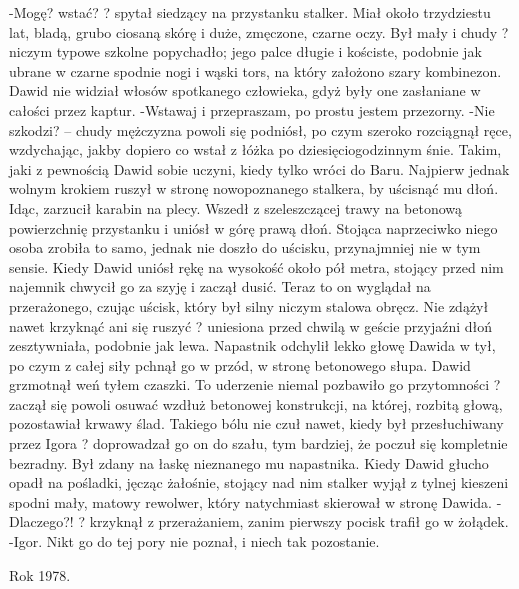 \documentclass[../MAIN.tex]{subfiles}
\begin{document}
-Mogę? wstać? ? spytał siedzący na przystanku stalker. Miał około trzydziestu lat, bladą, grubo ciosaną skórę i duże, zmęczone, czarne oczy. Był mały i chudy ? niczym typowe szkolne popychadło; jego palce długie i kościste, podobnie jak ubrane w czarne spodnie nogi i wąski tors, na który założono szary kombinezon. Dawid nie widział włosów spotkanego człowieka, gdyż były one zasłaniane w całości przez kaptur.
-Wstawaj i przepraszam, po prostu jestem przezorny.
-Nie szkodzi? -- chudy mężczyzna powoli się podniósł, po czym szeroko rozciągnął ręce, wzdychając, jakby dopiero co wstał z łóżka po dziesięciogodzinnym śnie. Takim, jaki z pewnością Dawid sobie uczyni, kiedy tylko wróci do Baru.
Najpierw jednak wolnym krokiem ruszył w stronę nowopoznanego stalkera, by uścisnąć mu dłoń. Idąc, zarzucił karabin na plecy. Wszedł z szeleszczącej trawy na betonową powierzchnię przystanku i uniósł w górę prawą dłoń. Stojąca naprzeciwko niego osoba zrobiła to samo, jednak nie doszło do uścisku, przynajmniej nie w tym sensie.
Kiedy Dawid uniósł rękę na wysokość około pół metra, stojący przed nim najemnik chwycił go za szyję i zaczął dusić.
Teraz to on wyglądał na przerażonego, czując uścisk, który był silny niczym stalowa obręcz. Nie zdążył nawet krzyknąć ani się ruszyć ? uniesiona przed chwilą w geście przyjaźni dłoń zesztywniała, podobnie jak lewa.
Napastnik odchylił lekko głowę Dawida w tył, po czym z całej siły pchnął go w przód, w stronę betonowego słupa. Dawid grzmotnął weń tyłem czaszki.
To uderzenie niemal pozbawiło go przytomności ? zaczął się powoli osuwać wzdłuż betonowej konstrukcji, na której, rozbitą głową, pozostawiał krwawy ślad. Takiego bólu nie czuł nawet, kiedy był przesłuchiwany przez Igora ? doprowadzał go on do szału, tym bardziej, że poczuł się kompletnie bezradny. Był zdany na łaskę nieznanego mu napastnika.
Kiedy Dawid głucho opadł na pośladki, jęcząc żałośnie, stojący nad nim stalker wyjął z tylnej kieszeni spodni mały, matowy rewolwer, który natychmiast skierował w stronę Dawida.
-Dlaczego?! ? krzyknął z przerażaniem, zanim pierwszy pocisk trafił go w żołądek.
-Igor. Nikt go do tej pory nie poznał, i niech tak pozostanie.

Rok 1978.
\end{document}
